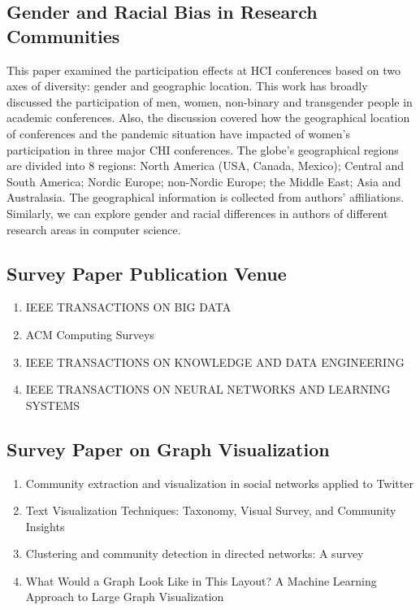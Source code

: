 \documentclass{article}
\begin{document}
\subsection{Gender and Racial Bias in Research Communities}
This paper \cite{mckay2022and} examined the participation effects at HCI conferences based on two axes of diversity: gender and geographic location. This work has broadly discussed the participation of men, women, non-binary and transgender people in academic conferences. Also, the discussion covered how the geographical location of conferences and the pandemic situation have impacted of women's participation in three major CHI conferences. The globe's geographical regions are divided into 8 regions: North America (USA, Canada, Mexico); Central and South America; Nordic Europe; non-Nordic Europe; the Middle East; Asia and Australasia. The geographical information is collected from authors' affiliations.  
Similarly, we can explore gender and racial differences in authors of different research areas in computer science. \cite{molwitz2023female}

\subsection{Survey Paper Publication Venue}
\begin{enumerate}
    \item IEEE TRANSACTIONS ON BIG DATA \cite{wang2022survey}
    \item ACM Computing Surveys \cite{tang2016survey}
    \item IEEE TRANSACTIONS ON KNOWLEDGE AND DATA ENGINEERING \cite{shi2016survey}
    \item IEEE TRANSACTIONS ON NEURAL NETWORKS AND LEARNING SYSTEMS \cite{su2022comprehensive}
    
\end{enumerate}
\subsection{Survey Paper on Graph Visualization }
\begin{enumerate}
    \item Community extraction and visualization in social networks applied to Twitter \cite{abdelsadek2018community}
    \item Text Visualization Techniques: Taxonomy, Visual Survey, and Community Insights  \cite{kucher2015text}
    \item Clustering and community detection in directed networks: A survey \cite{malliaros2013clustering}
    \item What Would a Graph Look Like in This Layout? A Machine Learning Approach to Large Graph Visualization \cite{kwon2017would}
 \end{enumerate}  
\end{document}
